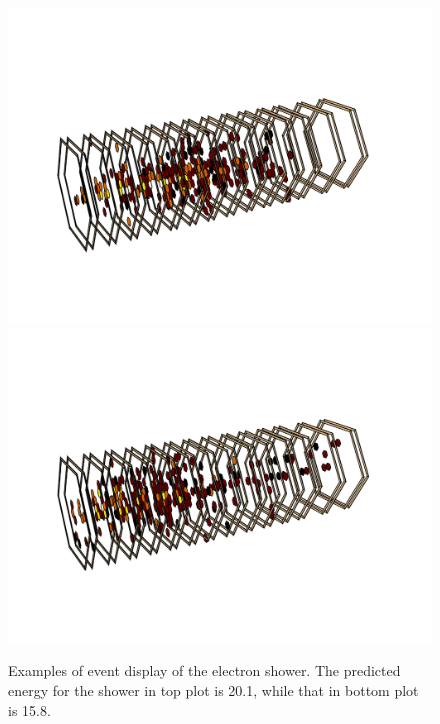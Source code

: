 \begin{figure}[p]
    \begin{center}  
    \includegraphics[width=1.0\textwidth]{Fig/fig_HGCAL/EvDisplay3D-simulation-Junev1-Ele20GeV-TBGenSim1-event2}\\
    \includegraphics[width=1.0\textwidth]{Fig/fig_HGCAL/EvDisplay3D-simulation-Junev1-Ele20GeV-TBGenSim1-event1012}\\
    \caption{Examples of event display of the electron shower. The predicted energy for the shower in top plot is 20.1\GeV, while that in bottom plot is 15.8\GeV.}
    \label{fig:EvDisplay1}
    \end{center}
\end{figure}

